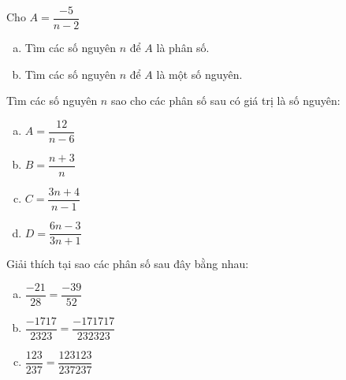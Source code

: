 \begin{bt}
\end{bt}   \begin{bt}

Cho $A= \dfrac{-5}{n-2}$
\begin{enumerate}[a)]
\item Tìm các số nguyên $n$ để $A$ là phân số.
\item Tìm các số nguyên $n$ để $A$ là một số nguyên.
\end{enumerate}

\end{bt}   \begin{bt}

Tìm các số nguyên $n$ sao cho các phân số sau có giá trị là số nguyên:
\begin{multicols}{2}
\begin{enumerate}[a)]
\item $A = \dfrac{12}{n-6}$
\item $B = \dfrac{n+3}{n}$
\item $C = \dfrac{3n+4}{n-1}$
\item $D =\dfrac{6n-3}{3n+1}$
\end{enumerate}
\end{multicols}

\end{bt}   \begin{bt}
 
Giải thích tại sao các phân số sau đây bằng nhau:
\begin{enumerate}[a)]
\item $\dfrac{-21}{28} =\dfrac{-39}{52}$
\item $\dfrac{-1717}{2323} =\dfrac{-171717}{232323}$
\item $\dfrac{123}{237} =\dfrac{123123}{237237}$
\end{enumerate}

\end{bt}   \begin{bt}


\end{bt}
